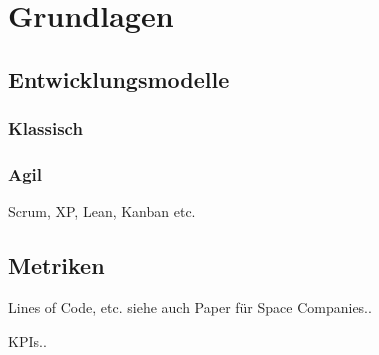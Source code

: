 \chapter{Grundlagen}

\section{Entwicklungsmodelle}

\subsection{Klassisch}

\subsection{Agil}

Scrum, XP, Lean, Kanban etc.

\section{Metriken}

Lines of Code, etc.
siehe auch Paper für Space Companies..

KPIs..

